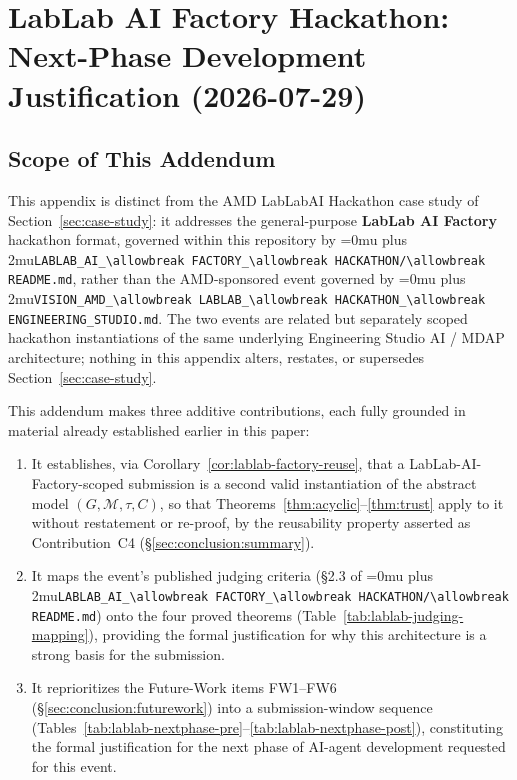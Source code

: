 \documentclass[12pt]{article}
\theoremstyle{definition}
\DeclareRobustCommand{\code}[1]{\begingroup\Urlmuskip=0mu plus 2mu\relax\nolinkurl{#1}\endgroup}
\newcommand{\VisionHackathon}{\code{VISION\_AMD\_\allowbreak LABLAB\_\allowbreak HACKATHON\_\allowbreak ENGINEERING\_STUDIO.md}}
\newcommand{\LabLabFactoryReadme}{\code{LABLAB\_AI\_\allowbreak FACTORY\_\allowbreak HACKATHON/\allowbreak README.md}}
\begin{document}
\section{LabLab AI Factory Hackathon: Next-Phase Development Justification (2026-07-29)}
\label{app:lablab-factory-nextphase}

\subsection{Scope of This Addendum}
\label{app:lablab-factory-scope}

This appendix is distinct from the AMD LabLabAI Hackathon case study of
Section~\ref{sec:case-study}: it addresses the general-purpose
\textbf{LabLab AI Factory} hackathon format, governed within this
repository by \LabLabFactoryReadme{}, rather than the AMD-sponsored
event governed by \VisionHackathon{}.  The two events are related but
separately scoped hackathon instantiations of the same underlying
Engineering Studio AI / MDAP architecture; nothing in this appendix
alters, restates, or supersedes Section~\ref{sec:case-study}.

This addendum makes three additive contributions, each fully grounded
in material already established earlier in this paper:
\begin{enumerate}
    \item[(i)] It establishes, via Corollary~\ref{cor:lablab-factory-reuse},
          that a LabLab-AI-Factory-scoped submission is a second valid
          instantiation of the abstract model
          $(G, \mathcal{M}, \tau, C)$, so that
          Theorems~\ref{thm:acyclic}--\ref{thm:trust} apply to it
          without restatement or re-proof, by the reusability property
          asserted as Contribution~C4 (\S\ref{sec:conclusion:summary}).
    \item[(ii)] It maps the event's published judging criteria
          (\S2.3 of \LabLabFactoryReadme{}) onto the four proved
          theorems (Table~\ref{tab:lablab-judging-mapping}), providing
          the formal justification for why this architecture is a
          strong basis for the submission.
    \item[(iii)] It reprioritizes the Future-Work items FW1--FW6
          (\S\ref{sec:conclusion:futurework}) into a submission-window
          sequence (Tables~\ref{tab:lablab-nextphase-pre}--\ref{tab:lablab-nextphase-post}), constituting the
          formal justification for the next phase of AI-agent
          development requested for this event.
\end{enumerate}
\end{document}

